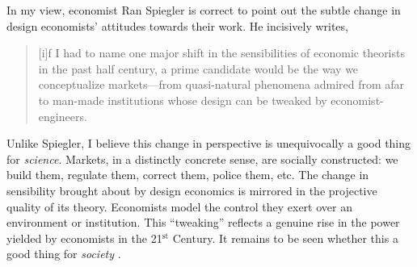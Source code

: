 In my view, economist Ran Spiegler \autocite*{spiegler2024} is correct to point out the subtle change in design economists' attitudes towards their work. He incisively writes, 
\begin{quote}
    [i]f I had to name one major shift in the sensibilities of economic theorists in the past half century, a prime candidate would be the way we conceptualize markets---from quasi-natural phenomena admired from afar to man-made institutions whose design can be tweaked by economist-engineers. \autocite[p137]{spiegler2024}
\end{quote}
\noindent Unlike Spiegler, I believe this change in perspective is unequivocally a good thing for \textit{science}. Markets, in a distinctly concrete sense, are socially constructed: we build them, regulate them, correct them, police them, etc. The change in sensibility brought about by design economics is mirrored in the projective quality of its theory. Economists model the control they exert over an environment or institution. This ``tweaking'' reflects a genuine rise in the power yielded by economists in the 21$^{\text{st}}$ Century. It remains to be seen whether this a good thing for \textit{society} \autocite{hitzigworking}.